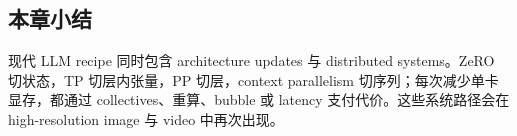 
\subsection{本章小结}

现代 LLM recipe 同时包含 architecture updates 与 distributed systems。ZeRO 切状态，TP 切层内张量，PP 切层，context parallelism 切序列；每次减少单卡显存，都通过 collectives、重算、bubble 或 latency 支付代价。这些系统路径会在 high-resolution image 与 video 中再次出现。

